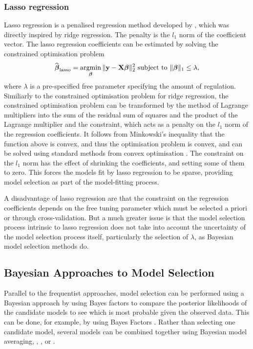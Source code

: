 \subsubsection{Lasso regression}
Lasso regression is a penalised regression method developed by \citep{Tibshirani1996}, which was directly
inspired by ridge regression. 
The penalty is the $l_1$ norm of the coefficient vector.
The lasso regression coefficients can be estimated by solving the constrained optimisation problem
$$
\widehat{\vbeta}_{\text{lasso}} = \argmin_\vbeta \|\vy - \mX \vbeta\|_2^2 \text{ subject to } \|\vbeta\|_1 \leq \lambda,
$$
where $\lambda$ is a pre-specified free parameter specifying the amount of regulation. Similiarly to the
constrained optimisation problem for ridge regression, the constrained optimisation problem can be transformed
by the method of Lagrange multipliers into the sum of the residual sum of squares and the product of the
Lagrange multiplier and the constraint, which acts as a penalty on the $l_1$ norm of the regression
coefficients. It follows from Minkowski's inequality that the function above is convex, and thus the
optimisation problem is convex, and can be solved using standard methods from convex optimisation
\citep{Boyd2010}.  The constraint on the $l_1$ norm has the effect of shrinking the coefficients, and setting
some of them to zero. This forces the models fit by lasso regression to be sparse, providing model selection
as part of the model-fitting process.

A disadvantage of lasso regression are that the constraint on the regression coefficients depends on the free
tuning parameter which must be selected a priori or through cross-validation. But a much greater issue is that
the model selection process intrinsic to lasso regression does not take into account the uncertainty of the
model selection process itself, particularly the selection of $\lambda$, as Bayesian model selection methods do.

\subsection{Bayesian Approaches to Model Selection}
Parallel to the frequentist approaches, model selection can be performed using a Bayesian approach by using
Bayes factors to compare the posterior likelihoods of the candidate models to see which is most probable given
the observed data. This can be done, for example, by using Bayes Factors \citep{Kass1993}. Rather than
selecting one candidate model, several models can be combined together using Bayesian model  averaging, 
\citep{Hoeting1999}, \citep{Raftery1997}, \citep{Fernandez2001} or \citep{Papaspiliopoulos2016}.

